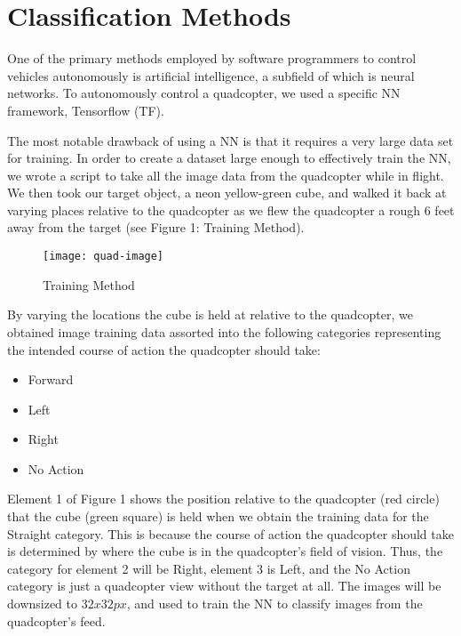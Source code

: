 \documentclass[12pt]{article}
\begin{document}
\section{Classification Methods}
{

	\quad One of the primary methods employed by software programmers to control vehicles autonomously is artificial intelligence, a subfield of which is neural networks. To autonomously control a quadcopter, we used a specific NN framework, Tensorflow (TF). \newline

	\quad The most notable drawback of using a NN is that it requires a very large data set for training. In order to create a dataset large enough to effectively train the NN, we wrote a script to take all the image data from the quadcopter while in flight. We then took our target object, a neon yellow-green cube, and walked it back at varying places relative to the quadcopter as we flew the quadcopter a rough 6 feet away from the target (see Figure 1: Training Method). 	
	

	\begin{figure}[h]
	\centering
	\texttt{[image: quad-image]}
	\caption{Training Method}
	\end{figure}

	\quad By varying the locations the cube is held at relative to the quadcopter, we obtained image training data assorted into the following categories representing the intended course of action the quadcopter should take:

	\begin{itemize}
		\item Forward
		\item Left
		\item Right
		\item No Action
	\end{itemize}

	\quad Element 1 of Figure 1 shows the position relative to the quadcopter (red circle) that the cube (green square) is held when we obtain the training data for the Straight category. 
	This is because the course of action the quadcopter should take is determined by where the cube is in the quadcopter's field of vision. 
	Thus, the category for element 2 will be Right, element 3 is Left, and the No Action category is just a quadcopter view without the target at all. 
	The images will be downsized to $32x32px$, and used to train the NN to classify images from the quadcopter's feed. \newline

}
\end{document}
